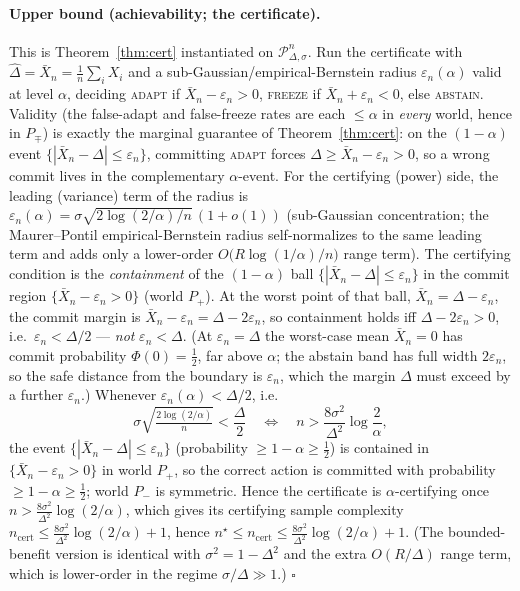 \paragraph{Upper bound (achievability; the certificate).}
This is Theorem~\ref{thm:cert} instantiated on $\mathcal P^n_{\Delta,\sigma}$. Run the certificate
with $\hat\Delta=\bar X_n=\tfrac1n\sum_i X_i$ and a sub-Gaussian/empirical-Bernstein radius
$\varepsilon_n(\alpha)$ valid at level $\alpha$, deciding \textsc{adapt} if
$\bar X_n-\varepsilon_n>0$, \textsc{freeze} if $\bar X_n+\varepsilon_n<0$, else \textsc{abstain}.
Validity (the false-adapt and false-freeze rates are each $\le\alpha$ in \emph{every} world,
hence in $P_\mp$) is exactly the marginal guarantee of Theorem~\ref{thm:cert}: on the
$(1-\alpha)$ event $\{|\bar X_n-\Delta|\le\varepsilon_n\}$, committing \textsc{adapt} forces
$\Delta\ge\bar X_n-\varepsilon_n>0$, so a wrong commit lives in the complementary $\alpha$-event.
For the certifying (power) side, the leading (variance) term of the radius is
$\varepsilon_n(\alpha)=\sigma\sqrt{2\log(2/\alpha)/n}\,(1+o(1))$
(sub-Gaussian concentration; the Maurer--Pontil empirical-Bernstein radius
self-normalizes to the same leading term and adds only a
lower-order $O\!\big(R\log(1/\alpha)/n\big)$ range term). The certifying condition is the
\emph{containment} of the $(1-\alpha)$ ball $\{|\bar X_n-\Delta|\le\varepsilon_n\}$ in the
commit region $\{\bar X_n-\varepsilon_n>0\}$ (world $P_+$). At the worst point of that ball,
$\bar X_n=\Delta-\varepsilon_n$, the commit margin is $\bar X_n-\varepsilon_n=\Delta-2\varepsilon_n$,
so containment holds iff $\Delta-2\varepsilon_n>0$, i.e.\ $\varepsilon_n<\Delta/2$ --- \emph{not}
$\varepsilon_n<\Delta$. (At $\varepsilon_n=\Delta$ the worst-case mean $\bar X_n=0$ has commit
probability $\Phi(0)=\tfrac12$, far above $\alpha$; the abstain band has full width $2\varepsilon_n$,
so the safe distance from the boundary is $\varepsilon_n$, which the margin $\Delta$ must exceed by
a further $\varepsilon_n$.) Whenever $\varepsilon_n(\alpha)<\Delta/2$, i.e.\
\[
   \sigma\sqrt{\tfrac{2\log(2/\alpha)}{n}}<\frac{\Delta}{2}
   \quad\Longleftrightarrow\quad
   n>\frac{8\sigma^2}{\Delta^2}\log\frac2\alpha ,
\]
the event $\{|\bar X_n-\Delta|\le\varepsilon_n\}$ (probability $\ge1-\alpha\ge\tfrac12$) is
contained in $\{\bar X_n-\varepsilon_n>0\}$ in world $P_+$, so the correct action is committed
with probability $\ge1-\alpha\ge\tfrac12$; world $P_-$ is symmetric. Hence the certificate is
$\alpha$-certifying once $n>\tfrac{8\sigma^2}{\Delta^2}\log(2/\alpha)$, which gives its certifying
sample complexity $n_{\mathrm{cert}}\le\tfrac{8\sigma^2}{\Delta^2}\log(2/\alpha)+1$, hence
$n^\star\le n_{\mathrm{cert}}\le\tfrac{8\sigma^2}{\Delta^2}\log(2/\alpha)+1$. (The bounded-benefit
version is identical with $\sigma^2=1-\Delta^2$ and the extra $O(R/\Delta)$ range term, which is
lower-order in the regime $\sigma/\Delta\gg1$.) \hfill$\square$

